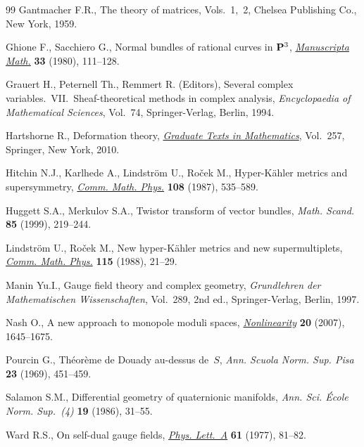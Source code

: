 \documentclass[pdftex]{sigma}
\numberwithin{equation}{section}
\begin{document}
\begin{thebibliography}{99}
Gantmacher F.R., The theory of matrices, {V}ols.~1,~2, Chelsea Publishing Co.,
  New York, 1959.

Ghione F., Sacchiero G., Normal bundles of rational curves in {${\bf P}^{3}$},
  \href{http://dx.doi.org/10.1007/BF01316971}{\textit{Manuscripta Math.}} \textbf{33} (1980), 111--128.

Grauert H., Peternell Th., Remmert R. (Editors), Several complex
  variables.~{VII}.~Sheaf-theoretical methods in complex analysis,
  \textit{Encyclopaedia of Mathematical Sciences}, Vol.~74, Springer-Verlag,
  Berlin, 1994.

Hartshorne R., Deformation theory, \href{http://dx.doi.org/10.1007/978-1-4419-1596-2}{\textit{Graduate Texts in Mathematics}}, Vol.~257, Springer, New York, 2010.

Hitchin N.J., Karlhede A., Lindstr{\"o}m U., Ro{\v{c}}ek M., Hyper-{K}\"ahler
  metrics and supersymmetry, \href{http://dx.doi.org/10.1007/BF01214418}{\textit{Comm. Math. Phys.}} \textbf{108} (1987),
  535--589.

Huggett S.A., Merkulov S.A., Twistor transform of vector bundles, \textit{Math.
  Scand.} \textbf{85} (1999), 219--244.

Lindstr{\"o}m U., Ro{\v{c}}ek M., New hyper-{K}\"ahler metrics and new
  supermultiplets, \href{http://dx.doi.org/10.1007/BF01238851}{\textit{Comm. Math. Phys.}} \textbf{115} (1988), 21--29.

Manin Yu.I., Gauge f\/ield theory and complex geometry, \textit{Grundlehren der
  Mathematischen Wissenschaften}, Vol.~289, 2nd ed., Springer-Verlag, Berlin,
  1997.

Nash O., A new approach to monopole moduli spaces, \href{http://dx.doi.org/10.1088/0951-7715/20/7/007}{\textit{Nonlinearity}}
  \textbf{20} (2007), 1645--1675.

Pourcin G., Th\'eor\`eme de {D}ouady au-dessus de~{$S$}, \textit{Ann. Scuola
  Norm. Sup. Pisa} \textbf{23} (1969), 451--459.

Salamon S.M., Dif\/ferential geometry of quaternionic manifolds, \textit{Ann.
  Sci. \'Ecole Norm. Sup.~(4)} \textbf{19} (1986), 31--55.

Ward R.S., On self-dual gauge f\/ields, \href{http://dx.doi.org/10.1016/0375-9601(77)90842-8}{\textit{Phys. Lett.~A}} \textbf{61}
  (1977), 81--82.

\end{thebibliography}\LastPageEnding
\end{document}
